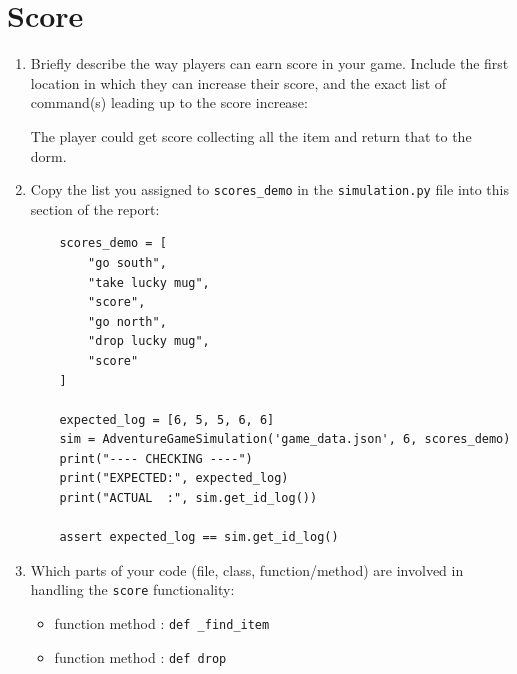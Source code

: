 \documentclass[11pt]{article}
\begin{document}
\section*{Score}
\begin{enumerate}

    \item Briefly describe the way players can earn score in your game. Include the first location in which they can increase their score, and the exact list of command(s) leading up to the score increase:

    The player could get score collecting all the item and return that to the dorm.

    \item Copy the list you assigned to \texttt{scores\_demo} in the \texttt{simulation.py} file into this section of the report:
    \begin{verbatim}
    scores_demo = [
        "go south",
        "take lucky mug",
        "score",
        "go north",
        "drop lucky mug",
        "score"
    ]

    expected_log = [6, 5, 5, 6, 6]
    sim = AdventureGameSimulation('game_data.json', 6, scores_demo)
    print("---- CHECKING ----")
    print("EXPECTED:", expected_log)
    print("ACTUAL  :", sim.get_id_log())

    assert expected_log == sim.get_id_log()
    \end{verbatim}


    \item Which parts of your code (file, class, function/method) are involved in handling the \texttt{score} functionality:
    \begin{itemize}
        \item function method : \texttt{def \_find\_item}
        \item function method : \texttt{def drop}
    \end{itemize}
\end{enumerate}
\end{document}
